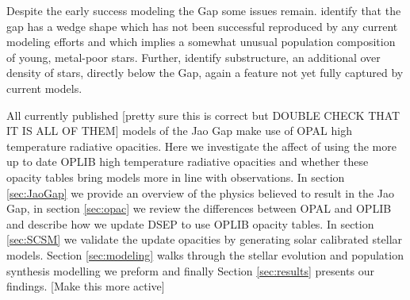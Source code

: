 Despite the early success modeling the Gap some issues remain.
\citeauthor{Jao2020} identify that the gap has a wedge shape which has not been
successful reproduced by any current modeling efforts and which implies a
somewhat unusual population composition of young, metal-poor stars. Further,
\citet{Feiden2021} identify substructure, an additional over density of stars,
directly below the Gap, again a feature not yet fully captured by current
models. 

All currently published {\color{red} [pretty sure this is correct but DOUBLE
CHECK THAT IT IS ALL OF THEM]} models of the Jao Gap make use of OPAL high
temperature radiative opacities. Here we investigate the affect of using the
more up to date OPLIB high temperature radiative opacities and whether these
opacity tables bring models more in line with observations. In section
\ref{sec:JaoGap} we provide an overview of the physics believed to result in the
Jao Gap, in section \ref{sec:opac} we review the differences between OPAL
and OPLIB and describe how we update DSEP to use OPLIB opacity tables. In
section \ref{sec:SCSM} we validate the update opacities by generating solar
calibrated stellar models. Section \ref{sec:modeling} walks through the stellar
evolution and population synthesis modelling we preform and finally Section
\ref{sec:results} presents our findings. {\color{red} [Make this more active]}

%

